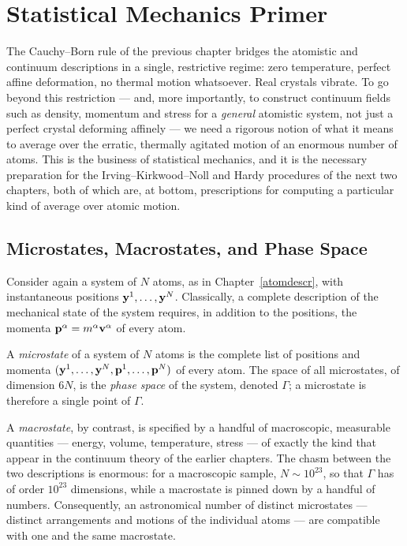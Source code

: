 \chapter{Statistical Mechanics Primer}\label{statmech}

The Cauchy--Born rule of the previous chapter bridges the atomistic and continuum descriptions in a single, restrictive regime: zero temperature, perfect affine deformation, no thermal motion whatsoever. Real crystals vibrate. To go beyond this restriction --- and, more importantly, to construct continuum fields such as density, momentum and stress for a \textit{general} atomistic system, not just a perfect crystal deforming affinely --- we need a rigorous notion of what it means to average over the erratic, thermally agitated motion of an enormous number of atoms. This is the business of statistical mechanics, and it is the necessary preparation for the Irving--Kirkwood--Noll and Hardy procedures of the next two chapters, both of which are, at bottom, prescriptions for computing a particular kind of average over atomic motion.

\section{Microstates, Macrostates, and Phase Space}\label{sec:microstates}

Consider again a system of $N$ atoms, as in Chapter~\ref{atomdescr}, with instantaneous positions $\mathbf{y}^1,\ldots,\mathbf{y}^N$. Classically, a complete description of the mechanical state of the system requires, in addition to the positions, the momenta $\mathbf{p}^\alpha = m^\alpha\mathbf{v}^\alpha$ of every atom.

\begin{definition}
	A \textit{microstate} of a system of $N$ atoms is the complete list of positions and momenta $(\mathbf{y}^1,\ldots,\mathbf{y}^N,\mathbf{p}^1,\ldots,\mathbf{p}^N)$ of every atom. The space of all microstates, of dimension $6N$, is the \textit{phase space} of the system, denoted $\Gamma$; a microstate is therefore a single point of $\Gamma$.
\end{definition}

A \textit{macrostate}, by contrast, is specified by a handful of macroscopic, measurable quantities --- energy, volume, temperature, stress --- of exactly the kind that appear in the continuum theory of the earlier chapters. The chasm between the two descriptions is enormous: for a macroscopic sample, $N\sim10^{23}$, so that $\Gamma$ has of order $10^{23}$ dimensions, while a macrostate is pinned down by a handful of numbers. Consequently, an astronomical number of distinct microstates --- distinct arrangements and motions of the individual atoms --- are compatible with one and the same macrostate.

